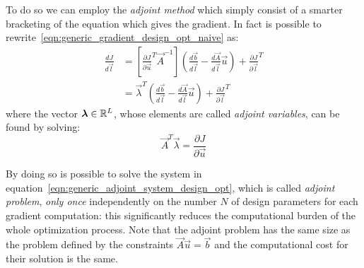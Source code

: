 To do so we can employ the \emph{adjoint method} which simply consist of a smarter bracketing of the equation which gives the gradient. In fact is possible to rewrite~\eqref{eqn:generic_gradient_design_opt_naive} as:
\begin{equation}
	\begin{aligned}
		\frac{dJ}{d\vec{l}} & = \left[ \frac{\partial J}{\partial \vec{u}}^T \vec{A}^{-1} \right] \left( \frac{d\vec{b}}{d\vec{l}} - \frac{d\vec{A}}{d\vec{l}}\vec{u} \right) + \frac{\partial J}{\partial \vec{l}}^T  \\
							& = \vec{\lambda}^T \left( \frac{d\vec{b}}{d\vec{l}} - \frac{d\vec{A}}{d\vec{l}}\vec{u} \right) + \frac{\partial J}{\partial \vec{l}}^T
	\end{aligned}
\end{equation}
where the vector $\boldsymbol{\lambda} \in \mathbb{R}^L$, whose elements are called \emph{adjoint variables}, can be found by solving:
\begin{equation}
	\label{eqn:generic_adjoint_system_design_opt}
	\vec{A}^T \vec{\lambda} = \frac{\partial J}{\partial \vec{u}}
\end{equation}

By doing so is possible to solve the system in equation~\eqref{eqn:generic_adjoint_system_design_opt}, which is called \emph{adjoint problem}, \emph{only once} independently on the number $N$ of design parameters for each gradient computation: this significantly reduces the computational burden of the whole optimization process. Note that the adjoint problem has the same size as the problem defined by the constraints $\vec{A} \vec{u} = \vec{b}$ and the computational cost for their solution is the same.




















